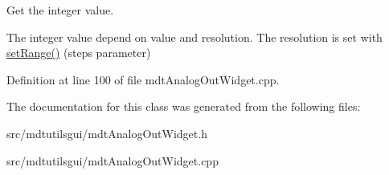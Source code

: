 Get the integer value. 

The integer value depend on value and resolution. The resolution is set with \hyperlink{classmdt_analog_out_widget_a0c50c8fc341f37bb57dfcb98092a64d9}{setRange()} (steps parameter) 

Definition at line 100 of file mdtAnalogOutWidget.cpp.



The documentation for this class was generated from the following files:\begin{DoxyCompactItemize}
\item 
src/mdtutilsgui/mdtAnalogOutWidget.h\item 
src/mdtutilsgui/mdtAnalogOutWidget.cpp\end{DoxyCompactItemize}
